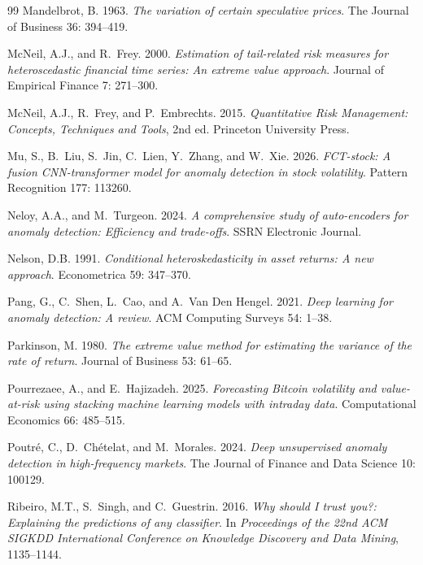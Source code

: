 \documentclass[]{interact}
\begin{document}
\begin{thebibliography}{99}
Mandelbrot, B. 1963. \emph{The variation of certain speculative prices}. The Journal of Business 36: 394--419.

McNeil, A.J., and R.~Frey. 2000. \emph{Estimation of tail-related risk measures for heteroscedastic financial time series: An extreme value approach}. Journal of Empirical Finance 7: 271--300.

McNeil, A.J., R.~Frey, and P.~Embrechts. 2015. \emph{Quantitative Risk Management: Concepts, Techniques and Tools}, 2nd ed. Princeton University Press.

Mu, S., B.~Liu, S.~Jin, C.~Lien, Y.~Zhang, and W.~Xie. 2026. \emph{FCT-stock: A fusion CNN-transformer model for anomaly detection in stock volatility}. Pattern Recognition 177: 113260. 

Neloy, A.A., and M.~Turgeon. 2024. \emph{A comprehensive study of auto-encoders for anomaly detection: Efficiency and trade-offs}. SSRN Electronic Journal.

Nelson, D.B. 1991. \emph{Conditional heteroskedasticity in asset returns: A new approach}. Econometrica 59: 347--370.

Pang, G., C.~Shen, L.~Cao, and A.~Van Den Hengel. 2021. \emph{Deep learning for anomaly detection: A review}. ACM Computing Surveys 54: 1--38.

Parkinson, M. 1980. \emph{The extreme value method for estimating the variance of the rate of return}. Journal of Business 53: 61--65.

Pourrezaee, A., and E.~Hajizadeh. 2025. \emph{Forecasting Bitcoin volatility and value-at-risk using stacking machine learning models with intraday data}. Computational Economics 66: 485--515. 

Poutr\'{e}, C., D.~Ch\'{e}telat, and M.~Morales. 2024. \emph{Deep unsupervised anomaly detection in high-frequency markets}. The Journal of Finance and Data Science 10: 100129. 

Ribeiro, M.T., S.~Singh, and C.~Guestrin. 2016. \emph{Why should I trust you?: Explaining the predictions of any classifier}. In \emph{Proceedings of the 22nd ACM SIGKDD International Conference on Knowledge Discovery and Data Mining}, 1135--1144.


\end{thebibliography}
\end{document}
